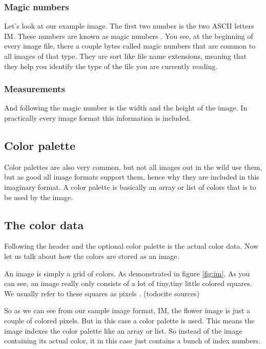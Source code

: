 \begin{refsection}
  \subsubsection{Magic numbers}
  \label{sec:magic-numbers}

  Let's look at our example image. The first two number is the two
  ASCII letters IM. These numbers are known as magic numbers
  . You see, at the beginning of every image
  file, there a couple bytes called magic numbers that are common to
  all images of that type. They are sort like file name extensions,
  meaning that they help you identify the type of the file you are
  currently reading.

  \subsubsection{Measurements}
  \label{sec:measurements}

  And following the magic number is the width and the height of the
  image. In practically every image format this information is
  included.

  \subsection{Color palette}
  \label{sec:color-pallete}

  Color palettes  are also very common, but not
  all images out in the wild use them, but as good all image formats support
  them, hence why they are included in this imaginary format. A color
  palette is basically an array or list of colors that is to be used
  by the image.

  \subsection{The color data}
  \label{sec:color-data}

  Following the header and the optional color palette is the actual
  color data. Now let us talk about how the colors are stored as an
  image.

  An image is simply a grid of colors. As demonstrated in figure
  \ref{fig:im}. As you can
  see, an image really only consists of a lot of tiny,tiny little
  colored squares. We usually refer to these squares as pixels
  . (todo{cite sources})

  So as we can see from our sample image format, IM, the flower image
  is just a couple of colored pixels. But in this case a color palette
  is used. This means the image indexes the color palette like an
  array or list. So instead of the image containing its actual color,
  it in this case just contains a bunch of index numbers.


\end{refsection}
